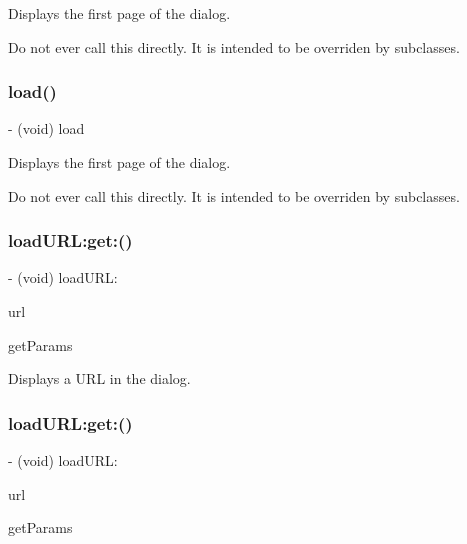 Displays the first page of the dialog.

Do not ever call this directly. It is intended to be overriden by subclasses. \mbox{\label{interfaceFBDialog_a41ca6458674d1701e6e1d143d5aeb972}} 
\subsubsection{\texorpdfstring{load()}{load()}\hspace{0.1cm}{\footnotesize\ttfamily [2/2]}}
{\footnotesize\ttfamily -\/ (void) load \begin{DoxyParamCaption}{ }\end{DoxyParamCaption}}

Displays the first page of the dialog.

Do not ever call this directly. It is intended to be overriden by subclasses. \mbox{\label{interfaceFBDialog_a48ed8ccf4d0c21239524cbfb0ef1c2bf}} 
\subsubsection{\texorpdfstring{load\+U\+R\+L\+:get\+:()}{loadURL:get:()}\hspace{0.1cm}{\footnotesize\ttfamily [1/2]}}
{\footnotesize\ttfamily -\/ (void) load\+U\+R\+L\+: \begin{DoxyParamCaption}\item[{(N\+S\+String $\ast$)}]{url }\item[{get:(N\+S\+Dictionary $\ast$)}]{get\+Params }\end{DoxyParamCaption}}

Displays a U\+RL in the dialog. \mbox{\label{interfaceFBDialog_a48ed8ccf4d0c21239524cbfb0ef1c2bf}} 
\subsubsection{\texorpdfstring{load\+U\+R\+L\+:get\+:()}{loadURL:get:()}\hspace{0.1cm}{\footnotesize\ttfamily [2/2]}}
{\footnotesize\ttfamily -\/ (void) load\+U\+R\+L\+: \begin{DoxyParamCaption}\item[{(N\+S\+String $\ast$)}]{url }\item[{get:(N\+S\+Dictionary $\ast$)}]{get\+Params }\end{DoxyParamCaption}}

